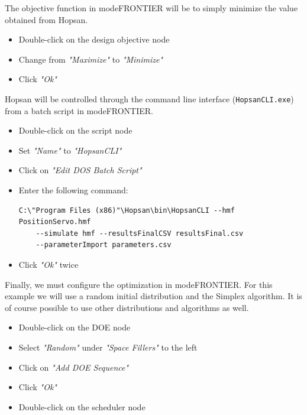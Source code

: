 \documentclass[a4paper]{article}
\begin{document}
\begin{tutenumerate}
The objective function in modeFRONTIER will be to simply minimize the value obtained from Hopsan.
\begin{itemize}
\item Double-click on the design objective node


\item Change from \textit{"Maximize"} to \textit{"Minimize"}
\item Click \textit{"Ok"}
\end{itemize}

\pagebreak

Hopsan will be controlled through the command line interface (\texttt{HopsanCLI.exe}) from a batch script in modeFRONTIER.
\begin{itemize}
\item Double-click on the script node


\item Set \textit{"Name"} to \textit{"HopsanCLI"}
\item Click on \textit{"Edit DOS Batch Script"}
\item Enter the following command:
\begin{lstlisting}[basicstyle=\footnotesize\ttfamily, breaklines=true]
C:\"Program Files (x86)"\Hopsan\bin\HopsanCLI --hmf PositionServo.hmf
    --simulate hmf --resultsFinalCSV resultsFinal.csv 
    --parameterImport parameters.csv
\end{lstlisting}
\item Click \textit{"Ok"} twice
\end{itemize}

Finally, we must configure the optimization in modeFRONTIER. For this example we will use a random initial distribution and the Simplex algorithm. It is of course possible to use other distributions and algorithms as well.
\begin{itemize}
\item Double-click on the DOE node


\item Select \textit{"Random"} under \textit{"Space Fillers"} to the left
\item Click on \textit{"Add DOE Sequence"}
\item Click \textit{"Ok"}
\item Double-click on the scheduler node


\end{itemize}
\end{tutenumerate}
\end{document}
